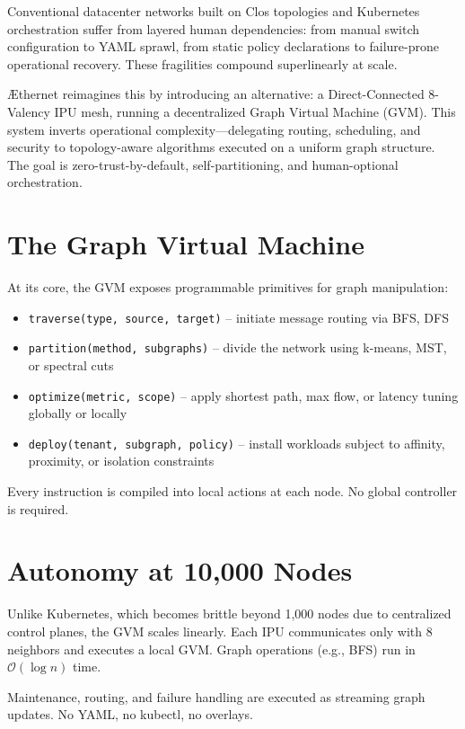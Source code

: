 \documentclass[../../../OAE-SPEC-MAIN.tex]{subfiles}
\begin{document}
Conventional datacenter networks built on Clos topologies and Kubernetes orchestration suffer from layered human dependencies: from manual switch configuration to YAML sprawl, from static policy declarations to failure-prone operational recovery. These fragilities compound superlinearly at scale.

\AE thernet reimagines this by introducing an alternative: a Direct-Connected 8-Valency IPU mesh, running a decentralized Graph Virtual Machine (GVM). This system inverts operational complexity—delegating routing, scheduling, and security to topology-aware algorithms executed on a uniform graph structure. The goal is zero-trust-by-default, self-partitioning, and human-optional orchestration.

\section{The Graph Virtual Machine}

At its core, the GVM exposes programmable primitives for graph manipulation:

\begin{itemize}
  \item \texttt{traverse(type, source, target)} – initiate message routing via BFS, DFS
  \item \texttt{partition(method, subgraphs)} – divide the network using k-means, MST, or spectral cuts
  \item \texttt{optimize(metric, scope)} – apply shortest path, max flow, or latency tuning globally or locally
  \item \texttt{deploy(tenant, subgraph, policy)} – install workloads subject to affinity, proximity, or isolation constraints
\end{itemize}

Every instruction is compiled into local actions at each node. No global controller is required.

\section{Autonomy at 10,000 Nodes}

Unlike Kubernetes, which becomes brittle beyond 1,000 nodes due to centralized control planes, the GVM scales linearly. Each IPU communicates only with 8 neighbors and executes a local GVM. Graph operations (e.g., BFS) run in \(\mathcal{O}(\log n)\) time. 

Maintenance, routing, and failure handling are executed as streaming graph updates. No YAML, no kubectl, no overlays.
\end{document}
